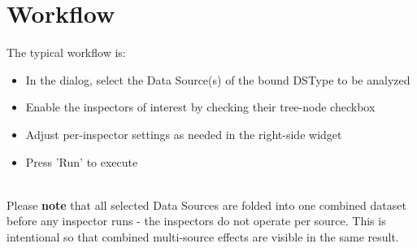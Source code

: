 \section{Workflow}
\label{sec:analyze_workflow}

The typical workflow is:

\begin{itemize}
\item In the dialog, select the Data Source(s) of the bound DSType to be analyzed
\item Enable the inspectors of interest by checking their tree-node checkbox
\item Adjust per-inspector settings as needed in the right-side widget
\item Press 'Run' to execute
\end{itemize}
\ \\

Please \textbf{note} that all selected Data Sources are folded into one combined dataset before any inspector runs - the inspectors do not operate per source. This is intentional so that combined multi-source effects are visible in the same result. \\

